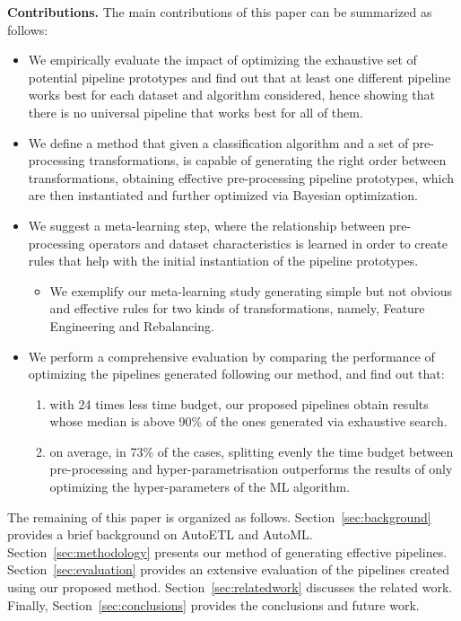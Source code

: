 \noindent\textbf{Contributions.} The main contributions of this paper can be summarized as follows:
\begin{itemize}
    \item We empirically evaluate the impact of optimizing the exhaustive set of potential pipeline prototypes and find out that at least one different pipeline works best for each dataset and algorithm considered, hence showing that there is no universal pipeline that works best for all of them.
    \item We define a method that given a classification algorithm and a set of pre-processing transformations, is capable of generating the right order between transformations, obtaining effective pre-processing pipeline prototypes, which are then instantiated and further optimized via Bayesian optimization.
    \item We suggest a meta-learning step, where the relationship between pre-processing operators and dataset characteristics is learned in order to create rules that help with the initial instantiation of the pipeline prototypes.
    \begin{itemize}
         \item We exemplify our meta-learning study generating simple but not obvious and effective rules for two kinds of transformations, namely, Feature Engineering and Rebalancing.
    \end{itemize}
    \item We perform a comprehensive evaluation by comparing the performance of optimizing the pipelines generated following our method, and find out that: 
    \begin{enumerate}
        \item with 24 times less time budget, our proposed pipelines obtain results whose median is above 90\% of the ones generated via exhaustive search.
        \item on average, in 73\% of the cases, splitting evenly the time budget between pre-processing and hyper-parametrisation outperforms the results of only optimizing the hyper-parameters of the ML algorithm.
    \end{enumerate}
\end{itemize}

The remaining of this paper is organized as follows. Section~\ref{sec:background} provides a brief background on AutoETL and AutoML.  Section~\ref{sec:methodology} presents our method of generating effective pipelines. 
Section~\ref{sec:evaluation} provides an extensive evaluation of the pipelines created using our proposed method. Section~\ref{sec:relatedwork} discusses the related work. Finally, Section~\ref{sec:conclusions} provides the conclusions and future work.

